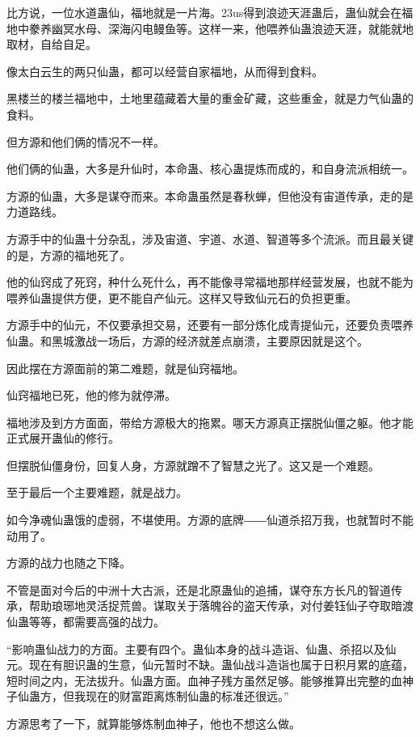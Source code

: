 
\begin{this_body}

比方说，一位水道蛊仙，福地就是一片海。23us得到浪迹天涯蛊后，蛊仙就会在福地中豢养幽冥水母、深海闪电鳗鱼等。这样一来，他喂养仙蛊浪迹天涯，就能就地取材，自给自足。

像太白云生的两只仙蛊，都可以经营自家福地，从而得到食料。

黑楼兰的楼兰福地中，土地里蕴藏着大量的重金矿藏，这些重金，就是力气仙蛊的食料。

但方源和他们俩的情况不一样。

他们俩的仙蛊，大多是升仙时，本命蛊、核心蛊提炼而成的，和自身流派相统一。

方源的仙蛊，大多是谋夺而来。本命蛊虽然是春秋蝉，但他没有宙道传承，走的是力道路线。

方源手中的仙蛊十分杂乱，涉及宙道、宇道、水道、智道等多个流派。而且最关键的是，方源的福地死了。

他的仙窍成了死窍，种什么死什么，再不能像寻常福地那样经营发展，也就不能为喂养仙蛊提供方便，更不能自产仙元。这样又导致仙元石的负担更重。

方源手中的仙元，不仅要承担交易，还要有一部分炼化成青提仙元，还要负责喂养仙蛊。和黑城激战一场后，方源的经济就差点崩溃，主要原因就是这个。

因此摆在方源面前的第二难题，就是仙窍福地。

仙窍福地已死，他的修为就停滞。

福地涉及到方方面面，带给方源极大的拖累。哪天方源真正摆脱仙僵之躯。他才能正式展开蛊仙的修行。

但摆脱仙僵身份，回复人身，方源就蹭不了智慧之光了。这又是一个难题。

至于最后一个主要难题，就是战力。

如今净魂仙蛊饿的虚弱，不堪使用。方源的底牌――仙道杀招万我，也就暂时不能动用了。

方源的战力也随之下降。

不管是面对今后的中洲十大古派，还是北原蛊仙的追捕，谋夺东方长凡的智道传承，帮助琅琊地灵活捉荒兽。谋取关于落魄谷的盗天传承，对付姜钰仙子夺取暗渡仙蛊等等，都需要高强的战力。

“影响蛊仙战力的方面。主要有四个。蛊仙本身的战斗造诣、仙蛊、杀招以及仙元。现在有胆识蛊的生意，仙元暂时不缺。蛊仙战斗造诣也属于日积月累的底蕴，短时间之内，无法拔升。仙蛊方面。血神子残方虽然足够。能够推算出完整的血神子仙蛊方，但我现在的财富距离炼制仙蛊的标准还很远。”

方源思考了一下，就算能够炼制血神子，他也不想这么做。


\end{this_body}
